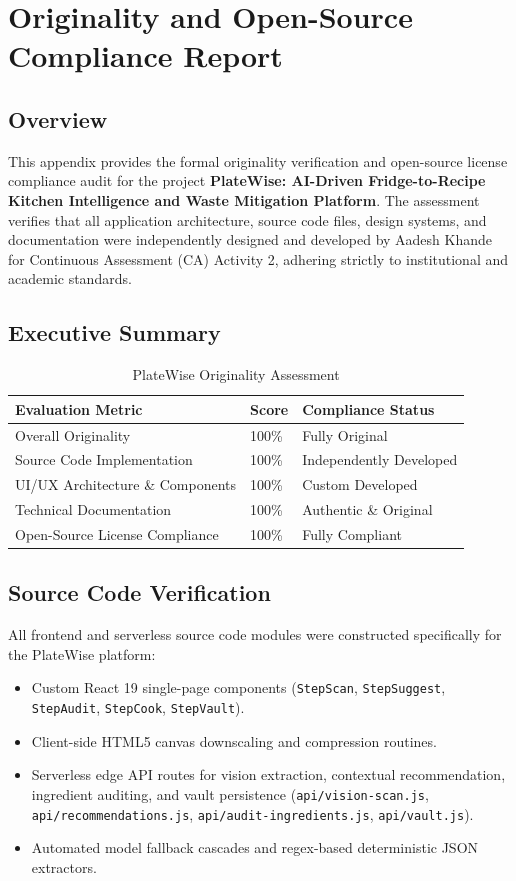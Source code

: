 \appendix
\chapter{Originality and Open-Source Compliance Report}

\section{Overview}
This appendix provides the formal originality verification and open-source license compliance audit for the project \textbf{PlateWise: AI-Driven Fridge-to-Recipe Kitchen Intelligence and Waste Mitigation Platform}. The assessment verifies that all application architecture, source code files, design systems, and documentation were independently designed and developed by Aadesh Khande for Continuous Assessment (CA) Activity 2, adhering strictly to institutional and academic standards.

\section{Executive Summary}
\begin{table}[H]
\centering
\caption{PlateWise Originality Assessment}
\begin{tabular}{|p{5.5cm}|p{3.5cm}|p{3.5cm}|}
\hline
\textbf{Evaluation Metric} & \textbf{Score} & \textbf{Compliance Status} \\ \hline
Overall Originality & 100\% & Fully Original \\ \hline
Source Code Implementation & 100\% & Independently Developed \\ \hline
UI/UX Architecture \& Components & 100\% & Custom Developed \\ \hline
Technical Documentation & 100\% & Authentic \& Original \\ \hline
Open-Source License Compliance & 100\% & Fully Compliant \\ \hline
\end{tabular}
\end{table}

\section{Source Code Verification}
All frontend and serverless source code modules were constructed specifically for the PlateWise platform:
\begin{itemize}
    \item Custom React 19 single-page components (\texttt{StepScan}, \texttt{StepSuggest}, \texttt{StepAudit}, \texttt{StepCook}, \texttt{StepVault}).
    \item Client-side HTML5 canvas downscaling and compression routines.
    \item Serverless edge API routes for vision extraction, contextual recommendation, ingredient auditing, and vault persistence (\texttt{api/vision-scan.js}, \texttt{api/recommendations.js}, \texttt{api/audit-ingredients.js}, \texttt{api/vault.js}).
    \item Automated model fallback cascades and regex-based deterministic JSON extractors.
\end{itemize}

